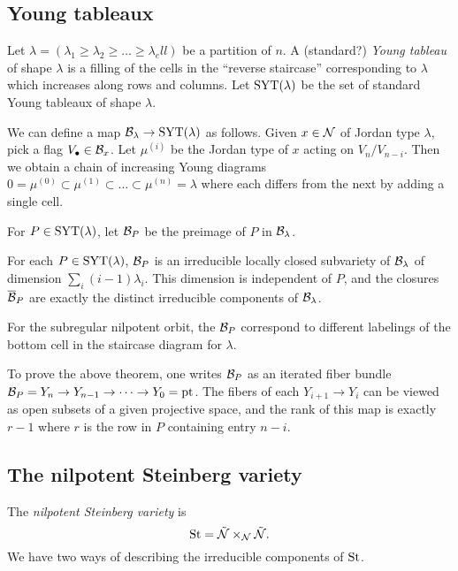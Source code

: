 \documentclass{article}
\begin{document}
\subsection{Young tableaux}

Let $\lambda = (\lambda_1 \geq \lambda_2 \geq \dots \geq \lambda_ell)$ be a partition of $n$.
A (standard?) \emph{Young tableau} of shape $\lambda$ is a filling of the cells in the ``reverse staircase'' corresponding to $\lambda$ which increases along rows and columns.
Let $\operatorname{SYT}(\lambda)$ be the set of standard Young tableaux of shape $\lambda$.

We can define a map $\mathcal{B}_\lambda \to \operatorname{SYT}(\lambda)$ as follows.
Given $x \in \mathcal{N}$ of Jordan type $\lambda$, pick a flag $V_\bullet \in \mathcal{B}_x$.
Let $\mu^{(i)}$ be the Jordan type of $x$ acting on $V_n / V_{n-i}$.
Then we obtain a chain of increasing Young diagrams $0 = \mu^{(0)} \subset \mu^{(1)} \subset \dots \subset \mu^{(n)} = \lambda$ where each differs from the next by adding a single cell.

For $P \in \operatorname{SYT}(\lambda)$, let $\mathcal{B}_P$ be the preimage of $P$ in $\mathcal{B}_\lambda$.

\begin{thm}
	For each $P \in \operatorname{SYT}(\lambda)$, $\mathcal{B}_P$ is an irreducible locally closed subvariety of $\mathcal{B}_\lambda$ of dimension $\sum_i (i - 1) \lambda_i$.
	This dimension is independent of $P$, and the closures $\overline{\mathcal{B}}_P$ are exactly the distinct irreducible components of $\mathcal{B}_\lambda$.
\end{thm}

\begin{ex}
	For the subregular nilpotent orbit, the $\mathcal{B}_P$ correspond to different labelings of the bottom cell in the staircase diagram for $\lambda$.
\end{ex}

To prove the above theorem, one writes $\mathcal{B}_P$ as an iterated fiber bundle $\mathcal{B}_P = Y_n \to Y_{n-1} \to \dots \to Y_0 = \mathrm{pt}$.
The fibers of each $Y_{i+1} \to Y_i$ can be viewed as open subsets of a given projective space, and the rank of this map is exactly $r - 1$ where $r$ is the row in $P$ containing entry $n - i$.

\subsection{The nilpotent Steinberg variety}

The \emph{nilpotent Steinberg variety} is
\[
	\mathrm{St} = \tilde{\mathcal{N}} \times_{\mathcal{N}} \tilde{\mathcal{N}}.
\]
We have two ways of describing the irreducible components of $\mathrm{St}$.
\end{document}
